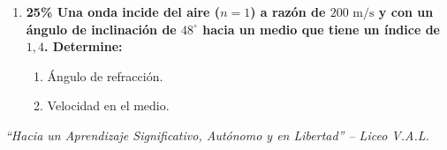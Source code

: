 \documentclass[11pt, letterpaper]{article}
\newif\ifshowanswers
\newcommand{\answer}[1]{ 
	\ifshowanswers 
	\par\vspace{0.15cm} 
	{\color{blue!80!black}\small\textbf{Solución:} #1} 
	\par\vspace{0.15cm} 
	\else 
	\par\vspace{0.3cm} 
	\fi 
}
\begin{document}
\begin{enumerate}[leftmargin=*, itemsep=0.8cm]
\begin{enumerate}[label=\alph*., itemsep=0.4cm, leftmargin=0.8cm]
			\item Velocidad de propagación. 
			\answer{ $\bullet$ Número de onda $k = 4\text{ rad/m}$.\\ 
				$\bullet$ Velocidad $v = \frac{\omega}{k} = \frac{6\pi}{4} = \mathbf{1.5\pi\text{ m/s}} \approx \mathbf{4.71\text{ m/s}}$ (hacia la izquierda). } 
		\end{enumerate} 
		
		\item \textbf{25\% \quad Una onda incide del aire ($n=1$) a razón de $200\text{ m/s}$ y con un ángulo de inclinación de $48^\circ$ hacia un medio que tiene un índice de $1,4$. Determine:} 
		\begin{enumerate}[label=\alph*., itemsep=0.4cm, leftmargin=0.8cm] 
			\item Ángulo de refracción. 
			\answer{ Ley de Snell: $n_1 \sin(\theta_1) = n_2 \sin(\theta_2)$ con $n_1 = 1.0$ (aire).\\ 
				$1.0 \cdot \sin(48^\circ) = 1.4 \cdot \sin(\theta_2) \implies \sin(\theta_2) = \frac{0.7431}{1.4} \approx 0.5308$.\\ 
				$\theta_2 = \arcsin(0.5308) \approx \mathbf{32,06^\circ}$. } 
			
			\item Velocidad en el medio. 
			\answer{ Velocidad en el segundo medio: $v_2 = \frac{v_1}{n_2} = \frac{200\text{ m/s}}{1.4} \approx \mathbf{142,86\text{ m/s}}$. } 
		\end{enumerate} 
		
	\end{enumerate} 
	\vfill 
	\begin{center} 
		\textit{\color{gray} ``Hacia un Aprendizaje Significativo, Autónomo y en Libertad'' -- Liceo V.A.L.} 
	\end{center} 
\end{document}
